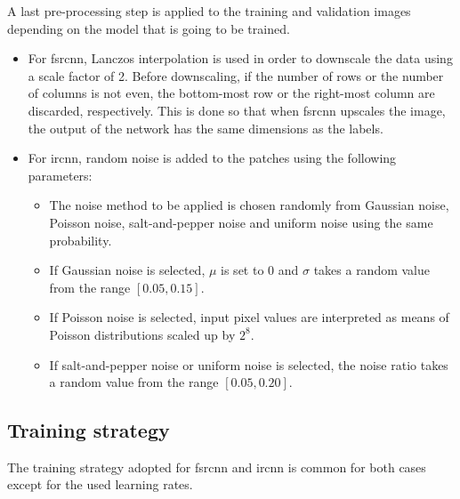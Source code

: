 A last pre-processing step is applied to the training and validation images depending on the model that is going to be trained.
\begin{itemize}
	\item For \gls{fsrcnn}, Lanczos interpolation is used in order to downscale the data using a scale factor of 2. Before downscaling, if the number of rows or the number of columns is not even, the bottom-most row or the right-most column are discarded, respectively. This is done so that when \gls{fsrcnn} upscales the image, the output of the network has the same dimensions as the labels.
	\item For \gls{ircnn}, random noise is added to the patches using the following parameters:
	\begin{itemize}
		\item The noise method to be applied is chosen randomly from Gaussian noise, Poisson noise, salt-and-pepper noise and uniform noise using the same probability.
		\item If Gaussian noise is selected, $\mu$ is set to 0 and $\sigma$ takes a random value from the range $[0.05, 0.15]$.
		\item If Poisson noise is selected, input pixel values are interpreted as means of Poisson distributions scaled up by $2^8$.
		\item If salt-and-pepper noise or uniform noise is selected, the noise ratio takes a random value from the range $[0.05, 0.20]$.
	\end{itemize}
\end{itemize}

\subsection{Training strategy}

The training strategy adopted for \gls{fsrcnn} and \gls{ircnn} is common for both cases except for the used learning rates.

